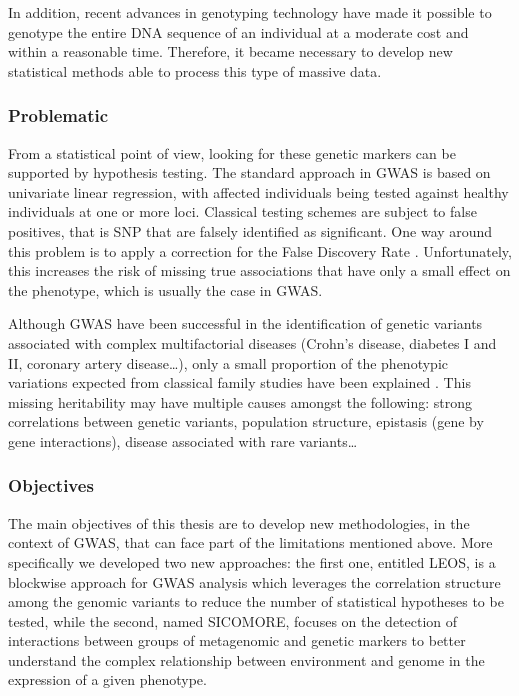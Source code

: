 \documentclass[]{book}
\begin{document}
In addition, recent advances in genotyping technology have made it
possible to genotype the entire DNA sequence of an individual at a
moderate cost and within a reasonable time. Therefore, it became
necessary to develop new statistical methods able to process this type
of massive data.

\hypertarget{problematic}{%
\subsubsection*{Problematic}\label{problematic}}

From a statistical point of view, looking for these genetic markers can
be supported by hypothesis testing. The standard approach in GWAS is
based on univariate linear regression, with affected individuals being
tested against healthy individuals at one or more loci. Classical
testing schemes are subject to false positives, that is SNP that are
falsely identified as significant. One way around this problem is to
apply a correction for the False Discovery Rate \citep[FDR,][]{benjamini_controlling_1995}. Unfortunately, this increases the risk of
missing true associations that have only a small effect on the
phenotype, which is usually the case in GWAS.

Although GWAS have been successful in the identification of genetic
variants associated with complex multifactorial diseases (Crohn's
disease, diabetes I and II, coronary artery
disease\ldots{}\citep{burton_genome-wide_2007}), only a small proportion of the
phenotypic variations expected from classical family studies have been
explained \citep{manolio_finding_2009}. This missing heritability may have
multiple causes amongst the following: strong correlations between
genetic variants, population structure, epistasis (gene by gene
interactions), disease associated with rare variants\ldots{}

\hypertarget{objectives}{%
\subsubsection*{Objectives}\label{objectives}}

The main objectives of this thesis are to develop new methodologies, in
the context of GWAS, that can face part of the limitations mentioned
above. More specifically we developed two new approaches: the first one,
entitled LEOS, is a blockwise approach for GWAS analysis which leverages
the correlation structure among the genomic variants to reduce the
number of statistical hypotheses to be tested, while the second, named
SICOMORE, focuses on the detection of interactions between groups of
metagenomic and genetic markers to better understand the complex
relationship between environment and genome in the expression of a given
phenotype.
\end{document}
